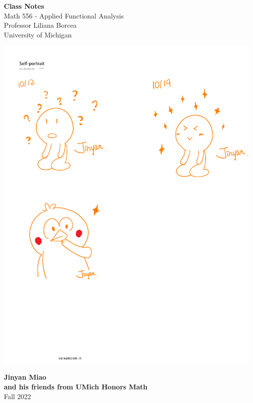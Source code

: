 \documentclass[11pt]{book}
\theoremstyle{break}
\theoremstyle{break}
\begin{document}
	\begin{titlepage}
		\begin{center}
			\vspace*{1cm}
			\Huge \color{red}
				\textbf{Class Notes}\\
			\vspace{0.5cm}			
			\Large \color{black}
				Math 556 - Applied Functional Analysis\\
				Professor Liliana Borcea\\	
				University of Michigan\\
			\vspace{2cm}

			\includegraphics[scale=0.99]{hmm.pdf}
			
			
			\vspace{4cm}
			\LARGE
				\textbf{Jinyan Miao}\\
				\large \textbf{and his friends from UMich Honors Math}\\
				\hfill\break
				\LARGE Fall 2022\\
			\vspace{1cm}

		\vspace*{\fill}
		\end{center}			
	\end{titlepage}
\end{document}

